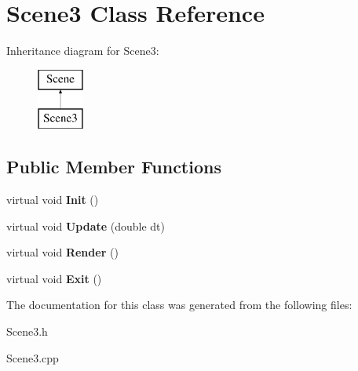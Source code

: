 \hypertarget{class_scene3}{\section{Scene3 Class Reference}
\label{class_scene3}
}
Inheritance diagram for Scene3\+:\begin{figure}[H]
\begin{center}
\leavevmode
\includegraphics[height=2.000000cm]{class_scene3}
\end{center}
\end{figure}
\subsection*{Public Member Functions}
\begin{DoxyCompactItemize}
\item 
\hypertarget{class_scene3_ae0fa7e48f701d3761d8c6ca01a334feb}{virtual void {\bfseries Init} ()}\label{class_scene3_ae0fa7e48f701d3761d8c6ca01a334feb}

\item 
\hypertarget{class_scene3_ac6aee0665d9f41f4a009fdcb29ac40f1}{virtual void {\bfseries Update} (double dt)}\label{class_scene3_ac6aee0665d9f41f4a009fdcb29ac40f1}

\item 
\hypertarget{class_scene3_aca22983af978d16e380bf5ca4ceab143}{virtual void {\bfseries Render} ()}\label{class_scene3_aca22983af978d16e380bf5ca4ceab143}

\item 
\hypertarget{class_scene3_a71f49cdf7e105d554c2c8f03b720cdc9}{virtual void {\bfseries Exit} ()}\label{class_scene3_a71f49cdf7e105d554c2c8f03b720cdc9}

\end{DoxyCompactItemize}


The documentation for this class was generated from the following files\+:\begin{DoxyCompactItemize}
\item 
Scene3.\+h\item 
Scene3.\+cpp\end{DoxyCompactItemize}
